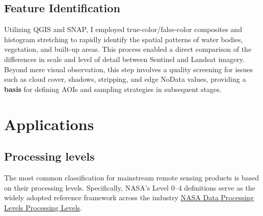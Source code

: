 \documentclass[
  letterpaper,
  DIV=11,
  numbers=noendperiod]{scrreprt}
\begin{document}
\subsection{Feature Identification}\label{feature-identification}

Utilizing QGIS and SNAP, I employed true-color/false-color composites
and histogram stretching to rapidly identify the spatial patterns of
water bodies, vegetation, and built-up areas. This process enabled a
direct comparison of the differences in scale and level of detail
between Sentinel and Landsat imagery. Beyond mere visual observation,
this step involves a quality screening for issues such as cloud cover,
shadows, stripping, and edge NoData values, providing a \textbf{basis}
for defining AOIs and sampling strategies in subsequent stages.

\section{Applications}\label{applications}

\subsection{\texorpdfstring{\textbf{Processing
levels}}{Processing levels}}\label{processing-levels}

The most common classification for mainstream remote sensing products is
based on their processing levels. Specifically, NASA's Level 0--4
definitions serve as the widely adopted reference framework across the
industry
\href{https://www.earthdata.nasa.gov/learn/earth-observation-data-basics/data-processing-levels?utm_source=chatgpt.com}{NASA
Data Processing Levels Processing Levels}.
\end{document}
